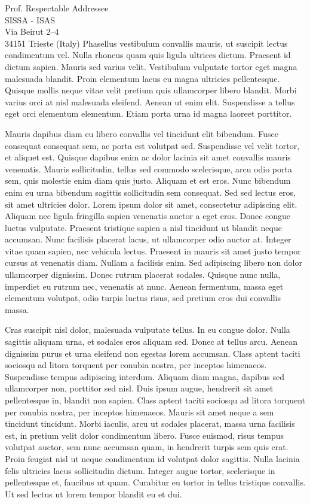 \documentclass[10pt,english,a4paper]{letteracdp}
\begin{document}
\begin{foldedletter}{
    Prof. Respectable Addressee\\
    SISSA - ISAS\\
    Via Beirut 2--4\\
    34151 Trieste (Italy)
  }
Phasellus vestibulum convallis mauris, ut suscipit lectus condimentum vel. Nulla rhoncus quam quis ligula ultrices dictum. Praesent id dictum sapien. Mauris sed varius velit. Vestibulum vulputate tortor eget magna malesuada blandit. Proin elementum lacus eu magna ultricies pellentesque. Quisque mollis neque vitae velit pretium quis ullamcorper libero blandit. Morbi varius orci at nisl malesuada eleifend. Aenean ut enim elit. Suspendisse a tellus eget orci elementum elementum. Etiam porta urna id magna laoreet porttitor.

Mauris dapibus diam eu libero convallis vel tincidunt elit bibendum. Fusce consequat consequat sem, ac porta est volutpat sed. Suspendisse vel velit tortor, et aliquet est. Quisque dapibus enim ac dolor lacinia sit amet convallis mauris venenatis. Mauris sollicitudin, tellus sed commodo scelerisque, arcu odio porta sem, quis molestie enim diam quis justo. Aliquam et est eros. Nunc bibendum enim eu urna bibendum sagittis sollicitudin sem consequat. Sed sed lectus eros, sit amet ultricies dolor. Lorem ipsum dolor sit amet, consectetur adipiscing elit. Aliquam nec ligula fringilla sapien venenatis auctor a eget eros. Donec congue luctus vulputate. Praesent tristique sapien a nisl tincidunt ut blandit neque accumsan. Nunc facilisis placerat lacus, ut ullamcorper odio auctor at. Integer vitae quam sapien, nec vehicula lectus. Praesent in mauris sit amet justo tempor cursus at venenatis diam. Nullam a facilisis enim. Sed adipiscing libero non dolor ullamcorper dignissim. Donec rutrum placerat sodales. Quisque nunc nulla, imperdiet eu rutrum nec, venenatis at nunc. Aenean fermentum, massa eget elementum volutpat, odio turpis luctus risus, sed pretium eros dui convallis massa.

Cras suscipit nisl dolor, malesuada vulputate tellus. In eu congue dolor. Nulla sagittis aliquam urna, et sodales eros aliquam sed. Donec at tellus arcu. Aenean dignissim purus et urna eleifend non egestas lorem accumsan. Class aptent taciti sociosqu ad litora torquent per conubia nostra, per inceptos himenaeos. Suspendisse tempus adipiscing interdum. Aliquam diam magna, dapibus sed ullamcorper non, porttitor sed nisl. Duis ipsum augue, hendrerit sit amet pellentesque in, blandit non sapien. Class aptent taciti sociosqu ad litora torquent per conubia nostra, per inceptos himenaeos. Mauris sit amet neque a sem tincidunt tincidunt. Morbi iaculis, arcu ut sodales placerat, massa urna facilisis est, in pretium velit dolor condimentum libero. Fusce euismod, risus tempus volutpat auctor, sem nunc accumsan quam, in hendrerit turpis sem quis erat. Proin feugiat nisl ut neque condimentum id volutpat dolor sagittis. Nulla lacinia felis ultricies lacus sollicitudin dictum. Integer augue tortor, scelerisque in pellentesque et, faucibus ut quam. Curabitur eu tortor in tellus tristique convallis. Ut sed lectus ut lorem tempor blandit eu et dui.


\end{foldedletter}
\end{document}
